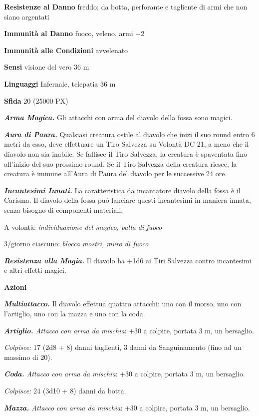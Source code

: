 \begin{multicols}{2}
\textbf{Resistenze al Danno} freddo; da botta, perforante e tagliente di armi che non siano argentati

\textbf{Immunità al Danno} fuoco, veleno, armi +2

\textbf{Immunità alle Condizioni} avvelenato

\textbf{Sensi} visione del vero 36 m

\textbf{Linguaggi} Infernale, telepatia 36 m

\textbf{Sfida} 20 (25000 PX)

\textit{\textbf{Arma Magica.}} Gli attacchi con arma del diavolo della fossa sono magici.

\textit{\textbf{Aura di Paura.}} Qualsiasi creatura ostile al diavolo che inizi il suo round entro 6 metri da esso, deve effettuare un Tiro Salvezza su Volontà DC 21, a meno che il diavolo non sia inabile. Se fallisce il Tiro Salvezza, la creatura è spaventata fino all'inizio del suo prossimo round. Se il Tiro Salvezza della creatura riesce, la creatura è immune all'Aura di Paura del diavolo per le successive 24 ore.

\textit{\textbf{Incantesimi Innati.}} La caratteristica da incantatore diavolo della fossa è il Carisma. Il diavolo della fossa può lanciare questi incantesimi in maniera innata, senza bisogno di componenti materiali:

A volontà: \textit{individuazione del magico, palla di fuoco}

3/giorno ciascuno: \textit{blocca mostri, muro di fuoco}

\textit{\textbf{Resistenza alla Magia.}} Il diavolo ha +1d6 ai Tiri Salvezza contro incantesimi e altri effetti magici.

\textbf{Azioni}

\textit{\textbf{Multiattacco.}} Il diavolo effettua quattro attacchi: uno con il morso, uno con l'artiglio, uno con la mazza e uno con la coda.

\textit{\textbf{Artiglio.} Attacco con arma da mischia}: +30 a colpire, portata 3 m, un bersaglio.

\textit{Colpisce:} 17 (2d8 + 8) danni taglienti, 3 danni da Sanguinamento (fino ad un massimo di 20).

\textit{\textbf{Coda.} Attacco con arma da mischia}: +30 a colpire, portata 3 m, un bersaglio.

\textit{Colpisce:} 24 (3d10 + 8) danni da botta.

\textit{\textbf{Mazza.} Attacco con arma da mischia}: +30 a colpire, portata 3 m, un bersaglio.


\end{multicols}
